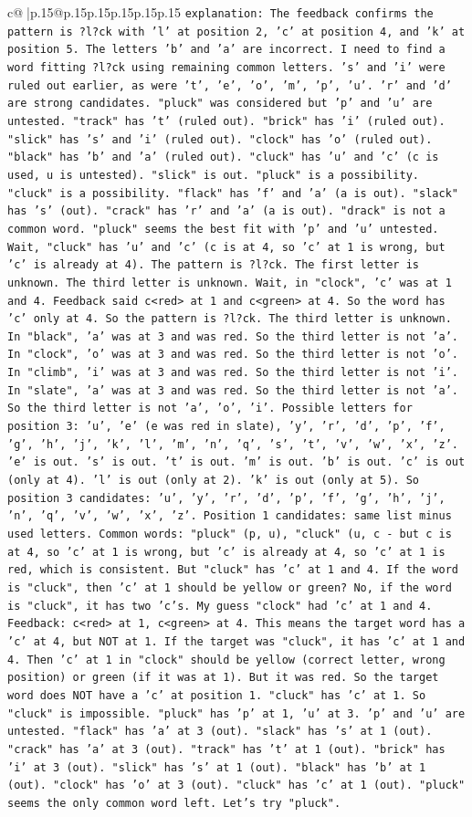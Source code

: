 \documentclass{article}
\begin{document}
{\begin{supertabular}{c@{$\;$}|p{.15\linewidth}@{}p{.15\linewidth}p{.15\linewidth}p{.15\linewidth}p{.15\linewidth}p{.15\linewidth}}
{{{                \texttt{explanation: The feedback confirms the pattern is ?l?ck with 'l' at position 2, 'c' at position 4, and 'k' at position 5. The letters 'b' and 'a' are incorrect. I need to find a word fitting ?l?ck using remaining common letters. 's' and 'i' were ruled out earlier, as were 't', 'e', 'o', 'm', 'p', 'u'. 'r' and 'd' are strong candidates. "pluck" was considered but 'p' and 'u' are untested. "track" has 't' (ruled out). "brick" has 'i' (ruled out). "slick" has 's' and 'i' (ruled out). "clock" has 'o' (ruled out). "black" has 'b' and 'a' (ruled out). "cluck" has 'u' and 'c' (c is used, u is untested). "slick" is out. "pluck" is a possibility. "cluck" is a possibility. "flack" has 'f' and 'a' (a is out). "slack" has 's' (out). "crack" has 'r' and 'a' (a is out). "drack" is not a common word. "pluck" seems the best fit with 'p' and 'u' untested. Wait, "cluck" has 'u' and 'c' (c is at 4, so 'c' at 1 is wrong, but 'c' is already at 4). The pattern is ?l?ck. The first letter is unknown. The third letter is unknown. Wait, in "clock", 'c' was at 1 and 4. Feedback said c<red> at 1 and c<green> at 4. So the word has 'c' only at 4. So the pattern is ?l?ck. The third letter is unknown. In "black", 'a' was at 3 and was red. So the third letter is not 'a'. In "clock", 'o' was at 3 and was red. So the third letter is not 'o'. In "climb", 'i' was at 3 and was red. So the third letter is not 'i'. In "slate", 'a' was at 3 and was red. So the third letter is not 'a'. So the third letter is not 'a', 'o', 'i'. Possible letters for position 3: 'u', 'e' (e was red in slate), 'y', 'r', 'd', 'p', 'f', 'g', 'h', 'j', 'k', 'l', 'm', 'n', 'q', 's', 't', 'v', 'w', 'x', 'z'. 'e' is out. 's' is out. 't' is out. 'm' is out. 'b' is out. 'c' is out (only at 4). 'l' is out (only at 2). 'k' is out (only at 5). So position 3 candidates: 'u', 'y', 'r', 'd', 'p', 'f', 'g', 'h', 'j', 'n', 'q', 'v', 'w', 'x', 'z'. Position 1 candidates: same list minus used letters. Common words: "pluck" (p, u), "cluck" (u, c {-} but c is at 4, so 'c' at 1 is wrong, but 'c' is already at 4, so 'c' at 1 is red, which is consistent. But "cluck" has 'c' at 1 and 4. If the word is "cluck", then 'c' at 1 should be yellow or green? No, if the word is "cluck", it has two 'c's. My guess "clock" had 'c' at 1 and 4. Feedback: c<red> at 1, c<green> at 4. This means the target word has a 'c' at 4, but NOT at 1. If the target was "cluck", it has 'c' at 1 and 4. Then 'c' at 1 in "clock" should be yellow (correct letter, wrong position) or green (if it was at 1). But it was red. So the target word does NOT have a 'c' at position 1. "cluck" has 'c' at 1. So "cluck" is impossible. "pluck" has 'p' at 1, 'u' at 3. 'p' and 'u' are untested. "flack" has 'a' at 3 (out). "slack" has 's' at 1 (out). "crack" has 'a' at 3 (out). "track" has 't' at 1 (out). "brick" has 'i' at 3 (out). "slick" has 's' at 1 (out). "black" has 'b' at 1 (out). "clock" has 'o' at 3 (out). "cluck" has 'c' at 1 (out). "pluck" seems the only common word left. Let's try "pluck".} \\
}}}
\end{supertabular}}
\end{document}
